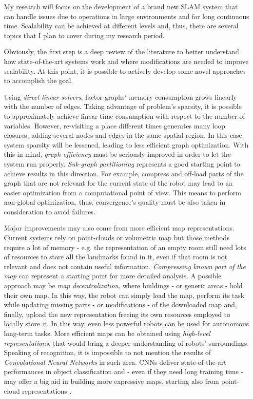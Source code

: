 \documentclass[10pt,a4paper, notitlepage]{report}
\begin{document}
My research will focus on the development of a brand new SLAM system that can handle issues due to operations in large environments and for long continuous time. Scalability can be achieved at different levels and, thus, there are several topics that I plan to cover during my research period.

Obviously, the first step is a deep review of the literature to better understand how state-of-the-art systems work and where modifications are needed to improve scalability. At this point, it is possible to actively develop some novel approaches to accomplish the goal.

Using \textit{direct linear solvers}, factor-graphs' memory consumption grows linearly with the number of edges. Taking advantage of problem's sparsity, it is possible to approximately achieve linear time consumption with respect to the number of variables. However, re-visiting a place different times generates many loop closures, adding several nodes and edges in the same spatial region. In this case, system sparsity will be lessened, leading to less efficient graph optimization. With this in mind, \textit{graph efficiency} must be seriously improved in order to let the system run properly. \textit{Sub-graph partitioning} \cite{grisetti2012condensed-m} represents a good starting point to achieve results in this direction. For example, compress and off-load parts of the graph that are not relevant for the current state of the robot may lead to an easier optimization from a computational point of view. This means to perform non-global optimization, thus, convergence's quality must be also taken in consideration to avoid failures.

Major improvements may also come from more efficient map representations. Current systems rely on point-clouds or volumetric map but those methods require a lot of memory - e.g. the representation of an empty room still need lots of resources to store all the landmarks found in it, even if that room is not relevant and does not contain useful information. \textit{Compressing known part of the map} \cite{lynen2015getoutofmylab} can represent a starting point for more detailed analysis. A possible approach may be \textit{map decentralization}, where buildings - or generic areas - hold their own map. In this way, the robot can simply load the map, perform its task while updating missing parts - or modifications - of the downloaded map and, finally, upload the new representation freeing its own resources employed to locally store it. In this way, even less powerful robots can be used for autonomous long-term tasks. More efficient maps can be obtained using \textit{high-level representations}, that would bring a deeper understanding of robots' surroundings. Speaking of recognition, it is impossible to not mention the results of \textit{Convolutional Neural Networks} \cite{krizhevsky2012alexnet} in such area. CNNs deliver state-of-the-art performances in object classification and - even if they need long training time - may offer a big aid in building more expressive maps, starting also from point-cloud representations \cite{maturana2015voxnet}.
\end{document}
